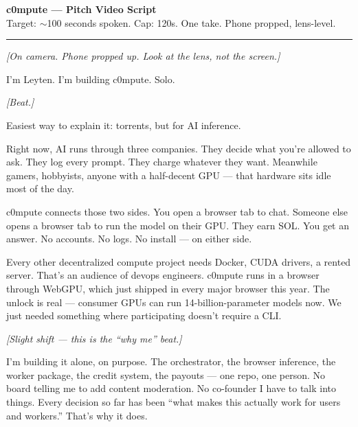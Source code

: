 \documentclass[12pt]{article}
\newcommand{\stage}[1]{{\itshape\color{stagecolor}#1}}
\begin{document}
{\Large\bfseries c0mpute --- Pitch Video Script}\\[0.4em]
{\small Target: $\sim$100 seconds spoken. Cap: 120s. One take. Phone propped, lens-level.}

\vspace{1em}\hrule\vspace{1em}

\stage{[On camera. Phone propped up. Look at the lens, not the screen.]}

\vspace{0.5em}

I'm Leyten. I'm building c0mpute. Solo.

\vspace{0.5em}

\stage{[Beat.]}

\vspace{0.5em}

Easiest way to explain it: torrents, but for AI inference.

Right now, AI runs through three companies. They decide what you're allowed to ask. They log every prompt. They charge whatever they want. Meanwhile gamers, hobbyists, anyone with a half-decent GPU --- that hardware sits idle most of the day.

c0mpute connects those two sides. You open a browser tab to chat. Someone else opens a browser tab to run the model on their GPU. They earn SOL. You get an answer. No accounts. No logs. No install --- on either side.

Every other decentralized compute project needs Docker, CUDA drivers, a rented server. That's an audience of devops engineers. c0mpute runs in a browser through WebGPU, which just shipped in every major browser this year. The unlock is real --- consumer GPUs can run 14-billion-parameter models now. We just needed something where participating doesn't require a CLI.

\vspace{0.4em}

\stage{[Slight shift --- this is the ``why me'' beat.]}

\vspace{0.4em}

I'm building it alone, on purpose. The orchestrator, the browser inference, the worker package, the credit system, the payouts --- one repo, one person. No board telling me to add content moderation. No co-founder I have to talk into things. Every decision so far has been ``what makes this actually work for users and workers.'' That's why it does.
\end{document}
